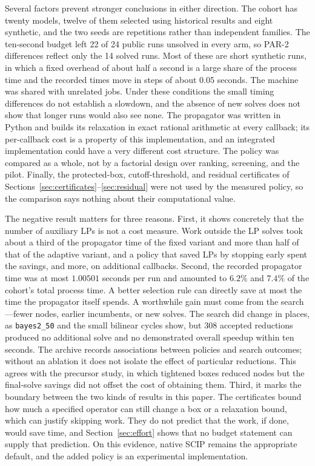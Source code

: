 Several factors prevent stronger conclusions in either direction. The cohort
has twenty models, twelve of them selected using historical results and eight
synthetic, and the two seeds are repetitions rather than independent families.
The ten-second budget left 22 of 24 public runs unsolved in every arm, so PAR-2
differences reflect only the 14 solved runs. Most of these are short synthetic
runs, in which a fixed overhead of about half a second is a large share of the
process time and the recorded times move in steps of about 0.05 seconds. The
machine was shared with unrelated jobs. Under
these conditions the small timing differences do not establish a slowdown,
and the absence of new solves does not show that longer runs would also see
none. The propagator was written in Python and builds its relaxation in exact
rational arithmetic at every callback; its per-callback cost is a property of
this implementation, and an integrated implementation could have a very
different cost structure. The policy was compared as a whole, not by a factorial
design over ranking, screening, and the pilot. Finally, the protected-box,
cutoff-threshold, and residual certificates of
Sections~\ref{sec:certificates}--\ref{sec:residual} were not used by the measured
policy, so the comparison says nothing about their computational value.

The negative result matters for three reasons. First, it shows concretely that
the number of auxiliary LPs is not a cost measure. Work outside the LP solves
took about a third of the propagator time of the fixed variant and more than half
of that of the adaptive variant, and a policy that saved LPs by stopping early
spent the savings, and more, on additional callbacks. Second, the recorded
propagator time was at most $1.00501$ seconds per run and amounted to
$6.2\%$ and $7.4\%$ of the cohort's total
process time. A better selection rule can directly save at most the time the
propagator itself spends. A worthwhile gain must come from the search---fewer
nodes, earlier incumbents, or new solves. The search did change in places, as
\texttt{bayes2\_50} and the small bilinear cycles show, but 308 accepted
reductions produced no additional solve and no demonstrated overall speedup
within ten seconds. The archive records associations between policies and
search outcomes; without an ablation it does not isolate the effect of
particular reductions. This agrees with the precursor study, in which tightened
boxes reduced nodes but the final-solve savings did not offset the cost of
obtaining them. Third, it marks the boundary between the two kinds of results
in this paper. The certificates bound how much a specified operator can still
change a box or a relaxation bound, which can justify skipping work. They do not
predict that the work, if done, would save time, and Section~\ref{sec:effort}
shows that no budget statement can supply that prediction. On this evidence,
native SCIP remains the appropriate default, and the added policy is an
experimental implementation.
